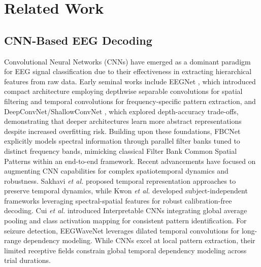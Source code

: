 \documentclass[journal]{IEEEtran}
\theoremstyle{plain}
\begin{document}
\section{Related Work}

\subsection{CNN-Based EEG Decoding}
Convolutional Neural Networks (CNNs) have emerged as a dominant paradigm for EEG signal classification due to their effectiveness in extracting hierarchical features from raw data. Early seminal works include EEGNet \cite{lawhern2018eegnet}, which introduced compact architecture employing depthwise separable convolutions for spatial filtering and temporal convolutions for frequency-specific pattern extraction, and DeepConvNet/ShallowConvNet \cite{schirrmeister2017deep}, which explored depth-accuracy trade-offs, demonstrating that deeper architectures learn more abstract representations despite increased overfitting risk. Building upon these foundations, FBCNet \cite{mane2021fbcnet} explicitly models spectral information through parallel filter banks tuned to distinct frequency bands, mimicking classical Filter Bank Common Spatial Patterns within an end-to-end framework. Recent advancements have focused on augmenting CNN capabilities for complex spatiotemporal dynamics and robustness. Sakhavi \textit{et al.} \cite{sakhavi2018learning} proposed temporal representation approaches to preserve temporal dynamics, while Kwon \textit{et al.} \cite{kwon2020subject} developed subject-independent frameworks leveraging spectral-spatial features for robust calibration-free decoding. Cui \textit{et al.} \cite{cui2023eeg} introduced Interpretable CNNs integrating global average pooling and class activation mapping for consistent pattern identification. For seizure detection, EEGWaveNet \cite{thuwajit2021eegwavenet} leverages dilated temporal convolutions for long-range dependency modeling. While CNNs excel at local pattern extraction, their limited receptive fields constrain global temporal dependency modeling across trial durations.
\end{document}
